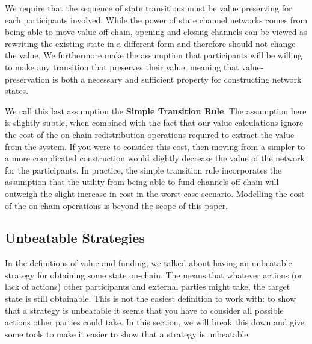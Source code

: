 We require that the sequence of state transitions must be value preserving for each participants involved. 
While the power of state channel networks comes from being able to move value off-chain, opening and closing channels can be viewed as rewriting the existing state in a different form and therefore should not change the value.
We furthermore make the assumption that participants will be willing to make any transition that preserves their value, meaning that value-preservation is both a necessary and sufficient property for constructing network states.

We call this last assumption the \textbf{Simple Transition Rule}. 
The assumption here is slightly subtle, when combined with the fact that our value calculations ignore the cost of the on-chain redistribution operations required to extract the value from the system.
If you were to consider this cost, then moving from a simpler to a more complicated construction would slightly decrease the value of the network for the participants.
In practice, the simple transition rule incorporates the assumption that the utility from being able to fund channels off-chain will outweigh the slight increase in cost in the worst-case scenario.
Modelling the cost of the on-chain operations is beyond the scope of this paper.

\subsection{Unbeatable Strategies}\label{sec:unbeatable-strategy}

In the definitions of value and funding, we talked about having an unbeatable strategy for obtaining some state on-chain.
The means that whatever actions (or lack of actions) other participants and external parties might take, the target state is still obtainable.
This is not the easiest definition to work with:
to show that a strategy is unbeatable it seems that you have to consider all possible actions other parties could take.
In this section, we will break this down and give some tools to make it easier to show that a strategy is unbeatable.

